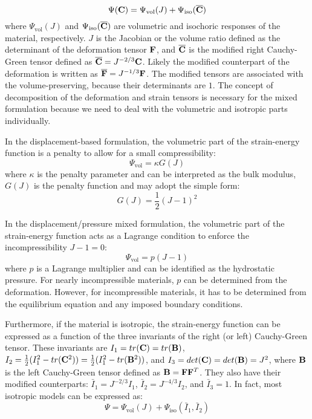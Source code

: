 \begin{equation} \label{energy_split}
\Psi(\bold{C}) = \Psi_\mathrm{vol}(J) + \Psi_\mathrm{iso}(\overline{\bold{C}})
\end{equation}
where $\Psi_\mathrm{vol}(J)$ and $\Psi_\mathrm{iso}(\overline{\bold{C}})$ are volumetric and isochoric responses of the material, respectively. $J$ is the Jacobian or the volume ratio defined as the determinant of the deformation tensor $\bold{F}$, and $\overline{\bold{C}}$ is the modified right Cauchy-Green tensor defined as 
$\overline{\bold{C}}  = J^{-2/3} \bold{C}$. Likely the modified counterpart of the deformation is written as $\overline{\bold{F}} = J^{-1/3} \bold{F}$. The modified tensors are associated with the volume-preserving, because their determinants are $1$. The concept of decomposition of the deformation and strain tensors is necessary for the mixed formulation because we need to deal with the volumetric and isotropic parts individually.

In the displacement-based formulation, the volumetric part of the strain-energy function is a penalty to allow for a small compressibility:
\begin{equation} \label{penalty}
\Psi_\mathrm{vol} = \kappa G(J)
\end{equation}
where $\kappa$ is the penalty parameter and can be interpreted as the bulk modulus, $G(J)$ is the penalty function and may adopt the simple form:
\begin{equation} \label{penalty2}
G(J) = \frac{1}{2}(J - 1)^2
\end{equation}

In the displacement/pressure mixed formulation, the volumetric part of the strain-energy function acts as a Lagrange condition to enforce the incompressibility $J -1 = 0$:
\begin{equation} \label{Lagrange}
\Psi_\mathrm{vol} = p(J-1)
\end{equation}
where $p$ is a Lagrange multiplier and can be identified as the hydrostatic pressure. For nearly incompressible materials, $p$ can be determined from the deformation. However, for incompressible materials, it has to be determined from the equilibrium equation and any imposed boundary conditions. 

Furthermore, if the material is isotropic, the strain-energy function can be expressed as a function of the three invariants of the right (or left) Cauchy-Green tensor. 
These invariants are 
$I_1 = tr(\bold{C}) = tr(\bold{B})$, $I_2 = \frac{1}{2}(I_1^2 - tr(\bold{C}^2)) = \frac{1}{2}(I_1^2 - tr(\bold{B}^2))$, and $I_3 = det(\bold{C}) = det(\bold{B}) = J^2$, where $\bold{B}$ is the left Cauchy-Green tensor defined as $\bold{B} = \bold{F}{\bold{F}}^T$. 
They also have their modified counterparts: $\bar{I}_1 = J^{-2/3}I_1$, $\bar{I}_2 = J^{-4/3}I_2$, and $\bar{I}_3 = 1$. In fact, most isotropic models can be expressed as:
\begin{equation}
\Psi = \Psi_\mathrm{vol}(J) + \Psi_\mathrm{iso}(\bar{I}_1, \bar{I}_2)
\end{equation}


